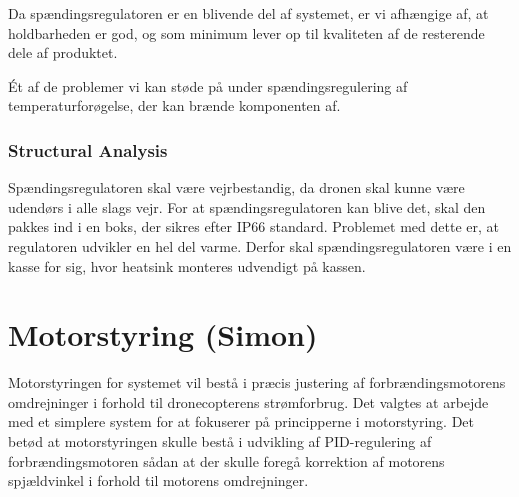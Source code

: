 Da spændingsregulatoren er en blivende del af systemet, er vi afhængige af, at holdbarheden er god, og som minimum lever op til kvaliteten af de resterende dele af produktet.

Ét af de problemer vi kan støde på under spændingsregulering af temperaturforøgelse, der kan brænde komponenten af.

\subsubsection{Structural Analysis}
\label{sec:generel-analyse-2}

Spændingsregulatoren skal være vejrbestandig, da dronen skal kunne være udendørs i alle slags vejr. For at spændingsregulatoren kan blive det, skal den pakkes ind i en boks, der sikres efter IP66 standard. Problemet med dette er, at regulatoren udvikler en hel del varme. Derfor skal spændingsregulatoren være i en kasse for sig, hvor heatsink monteres udvendigt på kassen.

\section{Motorstyring (Simon)}
\label{sec:motorstyring}

Motorstyringen for systemet vil bestå i præcis justering af forbrændingsmotorens omdrejninger i forhold til dronecopterens strømforbrug. Det valgtes at arbejde med et simplere system for at fokuserer på principperne i motorstyring. Det betød at motorstyringen skulle bestå i udvikling af PID-regulering af forbrændingsmotoren sådan at der skulle foregå korrektion af motorens spjældvinkel i forhold til motorens omdrejninger.




